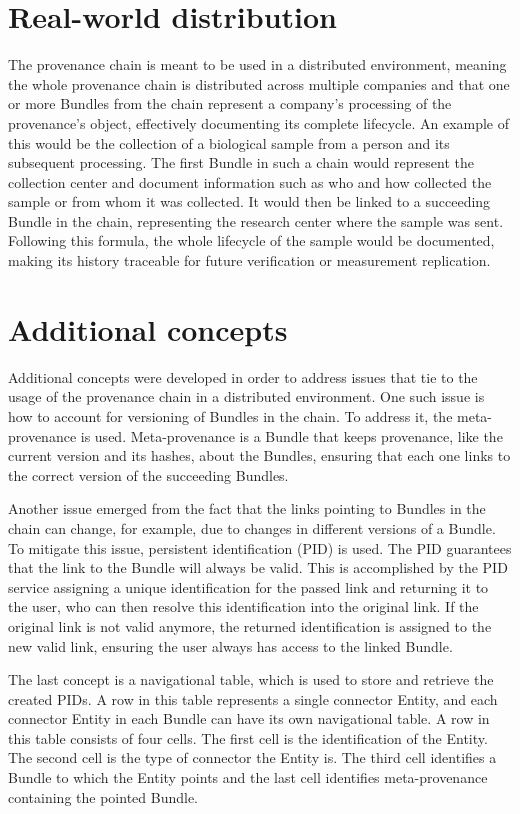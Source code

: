 \documentclass[
  digital,     %
  oneside,     %
  nosansbold,  %
  nocolorbold, %
  lof,         %
  lot,         %
]{fithesis4}
\begin{document}
\section{Real-world distribution}
The provenance chain is meant to be used in a distributed environment, meaning the whole provenance chain is distributed across multiple companies and that one or more Bundles from the chain represent a company's processing of the provenance's object, effectively documenting its complete lifecycle. An example of this would be the collection of a biological sample from a person and its subsequent processing. The first Bundle in such a chain would represent the collection center and document information such as who and how collected the sample or from whom it was collected. It would then be linked to a succeeding Bundle in the chain, representing the research center where the sample was sent. Following this formula, the whole lifecycle of the sample would be documented, making its history traceable for future verification or measurement replication.

\section{Additional concepts}
Additional concepts were developed in order to address issues that tie to the usage of the provenance chain in a distributed environment. One such issue is how to account for versioning of Bundles in the chain. To address it, the meta-provenance is used. Meta-provenance is a Bundle that keeps provenance, like the current version and its hashes, about the Bundles, ensuring that each one links to the correct version of the succeeding Bundles. \cite{metaprov}

Another issue emerged from the fact that the links pointing to Bundles in the chain can change, for example, due to changes in different versions of a Bundle. To mitigate this issue, persistent identification (PID) is used. The PID guarantees that the link to the Bundle will always be valid. This is accomplished by the PID service assigning a unique identification for the passed link and returning it to the user, who can then resolve this identification into the original link. If the original link is not valid anymore, the returned identification is assigned to the new valid link, ensuring the user always has access to the linked Bundle.

The last concept is a navigational table, which is used to store and retrieve the created PIDs. A row in this table represents a single connector Entity, and each connector Entity in each Bundle can have its own navigational table. A row in this table consists of four cells. The first cell is the identification of the Entity. The second cell is the type of connector the Entity is. The third cell identifies a Bundle to which the Entity points and the last cell identifies meta-provenance containing the pointed Bundle.
\end{document}
